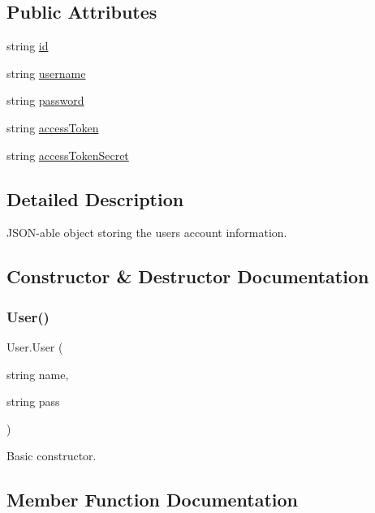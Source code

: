 \subsection*{Public Attributes}
\begin{DoxyCompactItemize}
\item 
string \mbox{\hyperlink{class_user_aeec50df41e3fc646fbf1ddf3a825fe49}{id}}
\item 
string \mbox{\hyperlink{class_user_a31bab5f53b917b7253a3210123eacf7b}{username}}
\item 
string \mbox{\hyperlink{class_user_a114fb9fd8c0362bd1298c6248ca68f5d}{password}}
\item 
string \mbox{\hyperlink{class_user_ac76de605e6cf755236947a31e98a6de9}{access\+Token}}
\item 
string \mbox{\hyperlink{class_user_a79b7e9fe1c8c513722b937d961e5190c}{access\+Token\+Secret}}
\end{DoxyCompactItemize}


\subsection{Detailed Description}
J\+S\+O\+N-\/able object storing the user\textquotesingle{}s account information. 

\subsection{Constructor \& Destructor Documentation}
\mbox{\label{class_user_a340ae260388cc9beadce82a506e3fe39}} 
\subsubsection{\texorpdfstring{User()}{User()}}
{\footnotesize\ttfamily User.\+User (\begin{DoxyParamCaption}\item[{string}]{name,  }\item[{string}]{pass }\end{DoxyParamCaption})\hspace{0.3cm}{\ttfamily [inline]}}



Basic constructor. 



\subsection{Member Function Documentation}
\mbox{\label{class_user_ab083d14c7cefbeb5eb91eb9ebb21a3bd}} 
